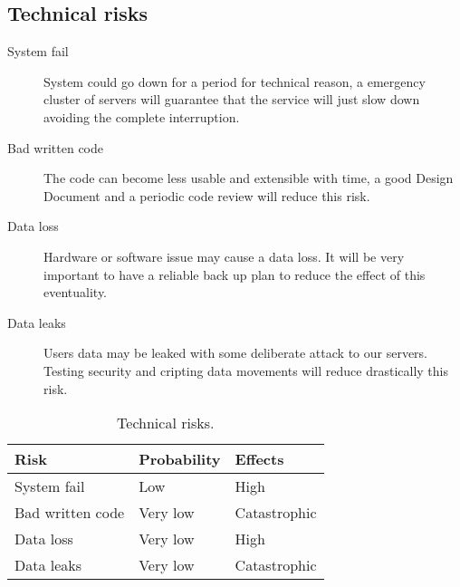 \subsection{Technical risks}

\begin{description}

    \item[System fail] System could go down for a period for technical reason, a emergency cluster of servers will guarantee that the service will just slow down avoiding the complete interruption.

    \item[Bad written code] The code can become less usable and extensible with time, a good Design Document and a periodic code review will reduce this risk.

    \item[Data loss] Hardware or software issue may cause a data loss. It will be very important to have a reliable back up plan to reduce the effect of this eventuality.

    \item[Data leaks] Users data may be leaked with some deliberate attack to our servers. Testing security and cripting data movements will reduce drastically this risk.

\end{description}

\begin{table}[p]
\centering
    \begin{tabular}{| l | l | l |}
        \hline
        \textbf{Risk}                   & \textbf{Probability}  & \textbf{Effects}  \\
        \hline
        System fail                        & Low              & High              \\  
        \hline
        Bad written code                  & Very low                   & Catastrophic          \\
        \hline
        Data loss                       & Very low                   & High      \\
        \hline
        Data leaks                      & Very low              & Catastrophic      \\
        \hline
    \end{tabular}
    \caption{Technical risks.}
    \label{tab:technical-risks}
\end{table}